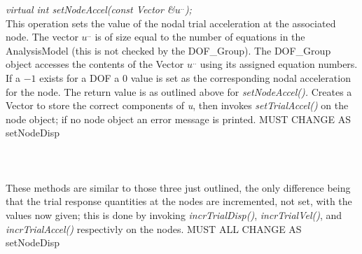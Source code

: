 {\em virtual int setNodeAccel(const Vector \&$u^{..}$);}\\
This operation sets the value of the nodal trial acceleration at the
associated node. The vector {\em $u^{..}$} is of size equal to the number of
equations in the AnalysisModel (this is not checked by the DOF\_Group).
The DOF\_Group object accesses the contents of the Vector {\em $u^{..}$} using
its assigned equation numbers. If a $-1$ exists for a DOF a $0$ value
is set as the corresponding nodal acceleration for the node. The return
value is as outlined above for {\em setNodeAccel().} Creates a Vector
to store the correct components of {\em u}, then invokes {\em setTrialAccel()}
on the node object; if no node object an error message is printed. 
MUST CHANGE AS setNodeDisp \\



 \\
\\
\\
These methods are similar to those three just outlined, the only
difference being that the trial response quantities at the nodes are
incremented, not set, with the values now given; this is done by
invoking {\em incrTrialDisp()}, {\em incrTrialVel()}, and {\em 
incrTrialAccel()} respectivly on the nodes. MUST ALL CHANGE AS
setNodeDisp \\ 






